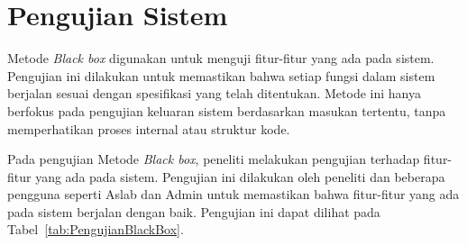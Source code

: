 \section{Pengujian Sistem}
Metode \textit{Black box} digunakan untuk menguji fitur-fitur yang ada pada sistem. Pengujian ini dilakukan untuk memastikan bahwa setiap fungsi dalam sistem berjalan sesuai dengan spesifikasi yang telah ditentukan. Metode ini hanya berfokus pada pengujian keluaran sistem berdasarkan masukan tertentu, tanpa memperhatikan proses internal atau struktur kode.

Pada pengujian Metode \textit{Black box}, peneliti melakukan pengujian terhadap fitur-fitur yang ada pada sistem. Pengujian ini dilakukan oleh peneliti dan beberapa pengguna seperti Aslab dan Admin untuk memastikan bahwa fitur-fitur yang ada pada sistem berjalan dengan baik. Pengujian ini dapat dilihat pada Tabel~\ref{tab:PengujianBlackBox}.

